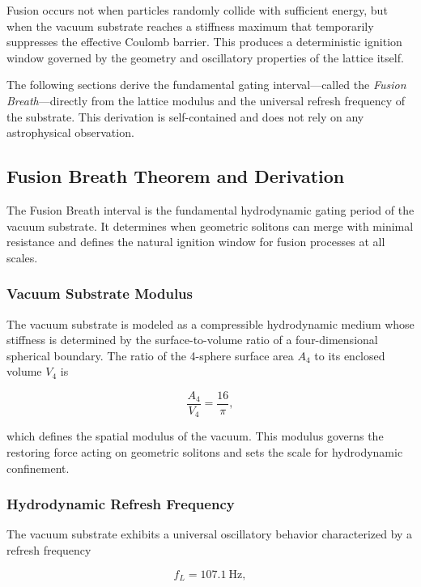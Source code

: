 \documentclass[11pt, letterpaper, openany]{book}
\begin{document}
Fusion occurs not when particles randomly collide with sufficient energy, but when the
vacuum substrate reaches a stiffness maximum that temporarily suppresses the effective
Coulomb barrier. This produces a deterministic ignition window governed by the geometry
and oscillatory properties of the lattice itself.

The following sections derive the fundamental gating interval—called the \emph{Fusion
Breath}—directly from the lattice modulus and the universal refresh frequency of the
substrate. This derivation is self-contained and does not rely on any astrophysical
observation.

\subsection{Fusion Breath Theorem and Derivation}

The Fusion Breath interval is the fundamental hydrodynamic gating period of the vacuum
substrate. It determines when geometric solitons can merge with minimal resistance and
defines the natural ignition window for fusion processes at all scales.

\subsubsection{Vacuum Substrate Modulus}

The vacuum substrate is modeled as a compressible hydrodynamic medium whose stiffness
is determined by the surface-to-volume ratio of a four-dimensional spherical boundary.
The ratio of the 4-sphere surface area $A_4$ to its enclosed volume $V_4$ is



\[
\frac{A_4}{V_4} = \frac{16}{\pi},
\]



which defines the spatial modulus of the vacuum. This modulus governs the restoring
force acting on geometric solitons and sets the scale for hydrodynamic confinement.

\subsubsection{Hydrodynamic Refresh Frequency}

The vacuum substrate exhibits a universal oscillatory behavior characterized by a refresh
frequency



\[
f_L = 107.1\ \text{Hz},
\]
\end{document}
